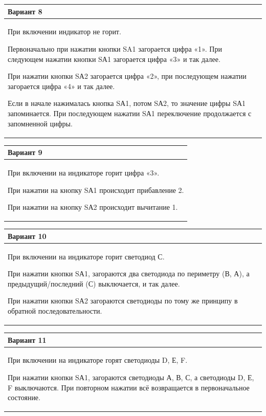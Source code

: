\documentclass[main.tex]{subfiles}
\begin{document}
\begin{small}
\vspace{6px}
\noindent 
\begin{tabularx}{\textwidth}{|X|}
\hline
\textbf{Вариант 8}\\
\hline
При включении индикатор не горит.

Первоначально при нажатии кнопки SA1 загорается цифра «1». При следующем нажатии кнопки SА1 загорается цифра «3» и так далее.

При нажатии кнопки SА2 загорается цифра «2», при последующем нажатии загорается цифра «4» и так далее.

Если в начале нажималась кнопка SА1, потом SА2, то значение цифры SА1 запоминается. При последующем нажатии SА1 пере­ключение продолжается с запомненной цифры.\\
\hline
\end{tabularx}

\vspace{6px}
\noindent 
\begin{tabularx}{\textwidth}{|X|}
\hline
\textbf{Вариант 9}\\
\hline
При включении на индикаторе горит цифра «3».

При нажатии на кнопку SА1 происходит прибавление 2.

При нажатии на кнопку SА2 происходит вычитание 1.\\
\hline
\end{tabularx}

\vspace{6px}
\noindent 
\begin{tabularx}{\textwidth}{|X|}
\hline
\textbf{Вариант 10}\\
\hline
При включении на индикаторе горит светодиод С.

При нажатии кнопки SА1, загораются два светодиода по пери­метру (В, А), а предыдущий/последний (С) выключается, и так да­лее.

При нажатии кнопки SА2 загораются светодиоды по тому же принципу в обратной последовательности.\\
\hline
\end{tabularx}


\newpage


\vspace{6px}
\noindent 
\begin{tabularx}{\textwidth}{|X|}
\hline
\textbf{Вариант 11}\\
\hline
При включении на индикаторе горят светодиоды D, Е, F.

При нажатии кнопки SА1, загораются светодиоды А, В, С, а све­тодиоды D, Е, F выключаются. При повторном нажатии всё воз­вращается в первоначальное состояние.


\end{tabularx}
\end{small}
\end{document}
